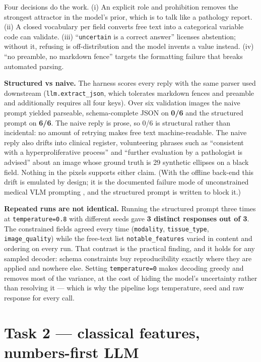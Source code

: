 \documentclass[a4paper,9pt,twocolumn]{extarticle}
\begin{document}
Four decisions do the work. (i) An explicit role and prohibition removes the
strongest attractor in the model's prior, which is to talk like a pathology
report. (ii) A closed vocabulary per field converts free text into a categorical
variable code can validate. (iii) ``\texttt{uncertain} is a correct answer''
licenses abstention; without it, refusing is off-distribution and the model
invents a value instead. (iv) ``no preamble, no markdown fence'' targets the
formatting failure that breaks automated parsing.

\textbf{Structured vs naive.} The harness scores every reply with the same
parser used downstream (\texttt{llm.extract\_json}, which tolerates markdown
fences and preamble and additionally requires all four keys). Over six
validation images the naive prompt yielded parseable, schema-complete JSON on
\textbf{0/6} and the structured prompt on \textbf{6/6}. The naive reply is
prose, so 0/6 is structural rather than incidental: no amount of retrying makes
free text machine-readable. The naive reply also drifts into clinical register,
volunteering phrases such as ``consistent with a hyperproliferative process''
and ``further evaluation by a pathologist is advised'' about an image whose
ground truth is 29 synthetic ellipses on a black field. Nothing in the pixels
supports either claim. (With the offline back-end this drift is emulated by
design; it is the documented failure mode of unconstrained medical VLM prompting
\cite{ji2023}, and the structured prompt is written to block it.)

\textbf{Repeated runs are not identical.} Running the structured prompt three
times at \texttt{temperature=0.8} with different seeds gave \textbf{3 distinct
responses out of 3}. The constrained fields agreed every time
(\texttt{modality}, \texttt{tissue\_type}, \texttt{image\_quality}) while the
free-text list \texttt{notable\_features} varied in content and ordering on
every run. That contrast is the practical finding, and it holds for any sampled
decoder: schema constraints buy reproducibility exactly where they are applied
and nowhere else. Setting \texttt{temperature=0} makes decoding greedy and
removes most of the variance, at the cost of hiding the model's uncertainty
rather than resolving it --- which is why the pipeline logs temperature, seed
and raw response for every call.

\section{Task 2 --- classical features, numbers-first LLM}
\end{document}
